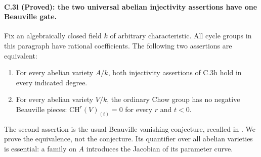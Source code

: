\paragraph{C.3l (Proved): the two universal abelian injectivity assertions have one Beauville gate.}
Fix an algebraically closed field $k$ of arbitrary characteristic.
All cycle groups in this paragraph have rational coefficients.
The following two assertions are equivalent:
\begin{enumerate}
\item For every abelian variety $A/k$, both injectivity assertions
      of C.3h hold in every indicated degree.
\item For every abelian variety $V/k$, the ordinary Chow group
      has no negative Beauville pieces:
      $\mathrm{CH}^r(V)_{(t)}=0$ for every $r$ and $t<0$.
\end{enumerate}
The second assertion is the usual Beauville vanishing conjecture,
recalled in \citet[Equation (5.9), p.~262]{rootBeauville2010}.
We prove the equivalence, not the conjecture. Its quantifier over
all abelian varieties is essential: a family on $A$ introduces
the Jacobian of its parameter curve.

